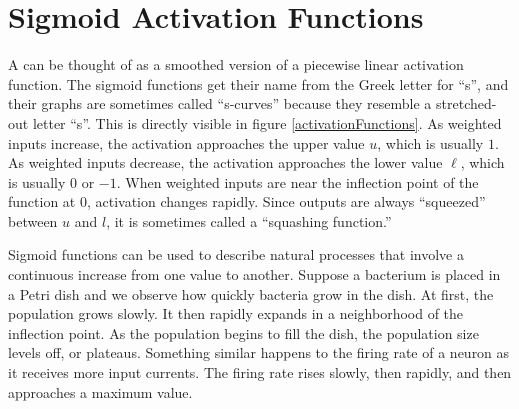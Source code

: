 \section{Sigmoid Activation Functions}


A  can be thought of as a smoothed version of a piecewise linear activation function. The sigmoid functions get their name from the Greek letter for ``s'', and their graphs are sometimes called ``s-curves'' because they resemble a stretched-out letter ``s''. This is directly visible in figure \ref{activationFunctions}. As weighted inputs increase, the activation approaches the upper value $u$, which is usually $1$. As weighted inputs decrease, the activation approaches the lower value $\ell$, which is usually $0$ or $-1$. When weighted inputs are near the inflection point of the function at 0, activation changes rapidly. Since outputs are always ``squeezed'' between $u$ and $l$, it is sometimes called a ``squashing function.''

  Sigmoid functions can be used to describe natural processes that involve a continuous increase from one value to another. Suppose a bacterium is placed in a Petri dish and we observe how quickly bacteria grow in the dish. At first, the population grows slowly. It then rapidly expands in a neighborhood of the inflection point. As the population begins to fill the dish, the population size levels off, or plateaus. Something similar happens to the firing rate of a neuron as it receives more input currents. The firing rate rises slowly, then rapidly, and then approaches a maximum value.

